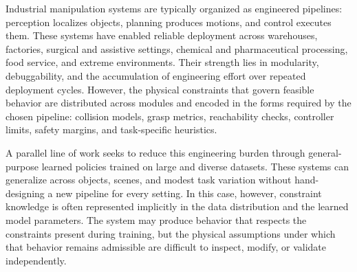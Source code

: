 Industrial manipulation systems are typically organized as engineered pipelines: perception localizes objects, planning produces motions, and control executes them.
These systems have enabled reliable deployment across warehouses, factories, surgical and assistive settings, chemical and pharmaceutical processing, food service, and extreme environments.
Their strength lies in modularity, debuggability, and the accumulation of engineering effort over repeated deployment cycles.
However, the physical constraints that govern feasible behavior are distributed across modules and encoded in the forms required by the chosen pipeline: collision models, grasp metrics, reachability checks, controller limits, safety margins, and task-specific heuristics.

A parallel line of work seeks to reduce this engineering burden through general-purpose learned policies trained on large and diverse datasets.
These systems can generalize across objects, scenes, and modest task variation without hand-designing a new pipeline for every setting.
In this case, however, constraint knowledge is often represented implicitly in the data distribution and the learned model parameters.
The system may produce behavior that respects the constraints present during training, but the physical assumptions under which that behavior remains admissible are difficult to inspect, modify, or validate independently.

